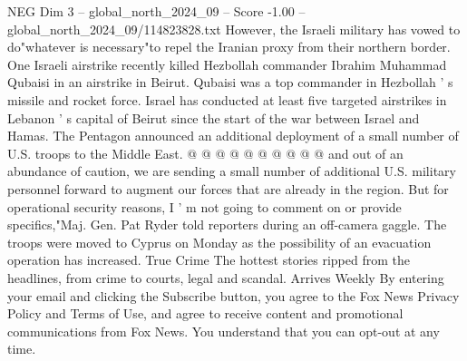 \begin{textsample}{NEG Dim 3 – global\_north\_2024\_09 – Score -1.00 – global\_north\_2024\_09/114823828.txt}
However, the Israeli military has vowed to do"whatever is necessary"to repel the Iranian proxy from their northern border.
One Israeli airstrike recently killed Hezbollah commander Ibrahim Muhammad Qubaisi in an airstrike in Beirut.
Qubaisi was a top commander in Hezbollah ' s missile and rocket force.
Israel has conducted at least five targeted airstrikes in Lebanon ' s capital of Beirut since the start of the war between Israel and Hamas.
The Pentagon announced an additional deployment of a small number of U.S. troops to the Middle East. @ @ @ @ @ @ @ @ @ @ and out of an abundance of caution, we are sending a small number of additional U.S. military personnel forward to augment our forces that are already in the region.
But for operational security reasons, I ' m not going to comment on or provide specifics,"Maj.
Gen.
Pat Ryder told reporters during an off-camera gaggle.
The troops were moved to Cyprus on Monday as the possibility of an evacuation operation has increased.
True Crime The hottest stories ripped from the headlines, from crime to courts, legal and scandal.
Arrives Weekly By entering your email and clicking the Subscribe button, you agree to the Fox News Privacy Policy and Terms of Use, and agree to receive content and promotional communications from Fox News.
You understand that you can opt-out at any time.

\end{textsample}
